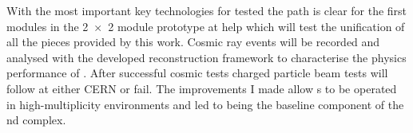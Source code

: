With the most important key technologies for \AC{} tested the path is clear for the first modules in the \num{2 x 2} module prototype at \gls{help} which will test the unification of all the pieces provided by this work.
Cosmic ray events will be recorded and analysed with the developed reconstruction framework to characterise the physics performance of \AC{}.
After successful cosmic tests charged particle beam tests will follow at either CERN or \gls{fail}.
The improvements I made allow \lartpc{}s to be operated in high-multiplicity environments and led to \AC{} being the baseline \lar{} component of the \dune{} \gls{nd} complex.